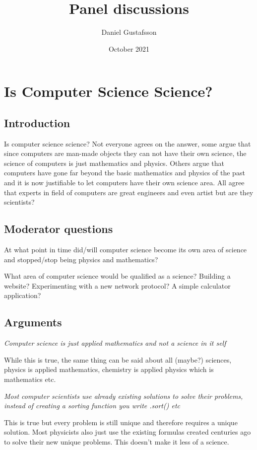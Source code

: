 \documentclass[11pt,a4paper]{article}
\title{Panel discussions}
\author{Daniel Gustafsson}
\date{October 2021}
\begin{document}
\maketitle

\section{Is Computer Science Science?}
\subsection{Introduction}
Is computer science science? Not everyone agrees on the answer, some argue that since computers are man-made objects they can not have
their own science, the science of computers is just mathematics and physics. Others argue that computers have gone far beyond the basic
mathematics and physics of the past and it is now justifiable to let computers have their own science area. All agree that experts in
field of computers are great engineers and even artist but are they scientists?

\subsection{Moderator questions}
At what point in time did/will computer science become its own area of science and stopped/stop being physics and mathematics?

What area of computer science would be qualified as a science? Building a website? Experimenting with a new network protocol? A simple calculator application?

\subsection{Arguments}
\textit{Computer science is just applied mathematics and not a science in it self}

While this is true, the same thing can be said about all (maybe?) sciences, physics is applied mathematics,
chemistry is applied physics which is mathematics etc.

\textit{Most computer scientists use already existing solutions to solve their problems, instead of creating a sorting function you write .sort() etc}

This is true but every problem is still unique and therefore requires a unique solution. Most physicists also just use the existing formulas created centuries
ago to solve their new unique problems. This doesn't make it less of a science.
\end{document}
